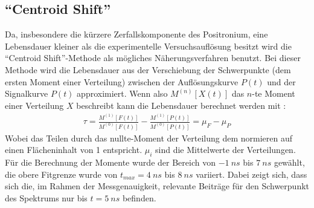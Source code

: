 \documentclass[a4paper,12pt]{article}
\begin{document}
\subsection{"`Centroid Shift"'}
Da, insbesondere die kürzere Zerfallskomponente des Positronium, eine Lebensdauer kleiner als die
experimentelle Versuchsauflösung besitzt wird die "`Centroid Shift"'-Methode \cite{versuchsanleitung}
als mögliches Näherungsverfahren benutzt. Bei dieser Methode wird die Lebensdauer aus der Verschiebung der Schwerpunkte (dem ersten Moment einer Verteilung)
zwischen der Auflösungskurve $P(t)$ und der Signalkurve $P(t)$ approximiert.
Wenn also $M^{(n)}[X(t)]$ das $n$-te Moment einer Verteilung $X$ beschreibt kann die Lebensdauer
berechnet werden mit \cite{versuchsanleitung}:
\begin{align*}
	\tau = \frac{M^{(1)}[F(t)]}{M^{(0)}[F(t)]} - \frac{M^{(1)}[P(t)]}{M^{(0)}[P(t)]  } = μ_{F} -
	μ_{P}
\end{align*}
Wobei das Teilen durch das nullte-Moment der Verteilung dem normieren auf einen Flächeninhalt von 1 entspricht.
$μ_i$ sind die Mittelwerte der Verteilungen.
Für die Berechnung der Momente wurde der Bereich von $\SI{-1}{ns}$ bis $\SI{7}{ns}$ gewählt, die obere Fitgrenze wurde von $t_{max}=\SI{4}{ns}$ bis $\SI{8}{ns}$ variiert. Dabei zeigt sich, dass
sich die, im Rahmen der Messgenauigkeit, relevante Beiträge für den Schwerpunkt des Spektrums nur bis  $t=\SI{5}{ns}$ befinden. 
\end{document}
